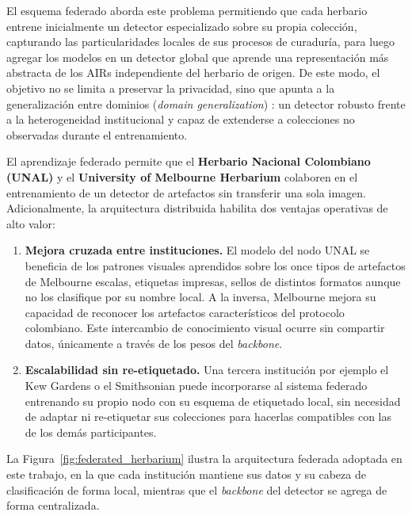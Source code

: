 El esquema federado aborda este problema permitiendo que cada herbario entrene inicialmente
un detector especializado sobre su propia colección, capturando las particularidades
locales de sus procesos de curaduría, para luego agregar los modelos en un detector global
que aprende una representación más abstracta de los AIRs independiente del herbario de
origen. De este modo, el objetivo no se limita a preservar la privacidad, sino que apunta a
la generalización entre dominios (\textit{domain generalization})%
: un detector robusto frente a la heterogeneidad institucional y capaz de extenderse a
colecciones no observadas durante el entrenamiento.

El aprendizaje federado permite que el \textbf{Herbario Nacional Colombiano (UNAL)} y el
\textbf{University of Melbourne Herbarium} colaboren en el entrenamiento de un detector de
artefactos sin transferir una sola imagen. Adicionalmente, la arquitectura distribuida
habilita dos ventajas operativas de alto valor:
 
\begin{enumerate}
    \item \textbf{Mejora cruzada entre instituciones.} El modelo del nodo UNAL se beneficia
    de los patrones visuales aprendidos sobre los once tipos de artefactos de Melbourne
    escalas, etiquetas impresas, sellos de distintos formatos aunque no los clasifique
    por su nombre local. A la inversa, Melbourne mejora su capacidad de reconocer los
    artefactos característicos del protocolo colombiano. Este intercambio de conocimiento
    visual ocurre sin compartir datos, únicamente a través de los pesos del \textit{backbone}.
 
    \item \textbf{Escalabilidad sin re-etiquetado.} Una tercera institución por ejemplo el
    Kew Gardens o el Smithsonian puede incorporarse al sistema federado entrenando su
    propio nodo con su esquema de etiquetado local, sin necesidad de adaptar ni re-etiquetar
    sus colecciones para hacerlas compatibles con las de los demás participantes.
\end{enumerate}
 
La Figura~\ref{fig:federated_herbarium} ilustra la arquitectura federada adoptada en este
trabajo, en la que cada institución mantiene sus datos y su cabeza de clasificación de
forma local, mientras que el \textit{backbone} del detector se agrega de forma centralizada.
 
